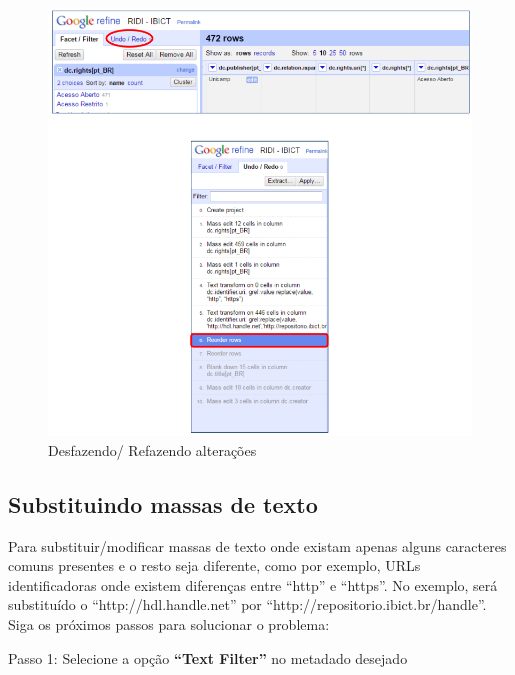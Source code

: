 \documentclass[12pt,hidelinks]{article}
\begin{document}
    \begin{figure}[!htp]
                \centering
                \includegraphics[scale=0.8]{figura/Figura195.png}
                \caption{Desfazendo/ Refazendo alterações}
            \label{Rotulo}
        \end{figure}

\newpage

    \subsection{Substituindo massas de texto}
    
    Para substituir/modificar massas de texto onde existam apenas alguns caracteres comuns presentes e o resto seja diferente, como por exemplo, URLs identificadoras onde existem diferenças entre “http” e “https”. No exemplo, será substituído o “http://hdl.handle.net” por “http://repositorio.ibict.br/handle”. Siga os próximos passos para solucionar o problema: 
    
    \singlespacing
    
    Passo 1: Selecione a opção \textbf{“Text Filter”} no metadado desejado
    
\end{document}
